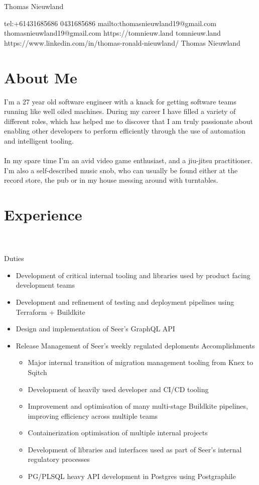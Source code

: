 \documentclass{resume}
\begin{document}
\ContactName
{Thomas Nieuwland}

\ContactInfoDigital
  {tel:+61431685686}
  {0431685686}
  {mailto:thomasnieuwland19@gmail.com}
  {thomasnieuwland19@gmail.com}
  {https://tomnieuw.land}
  {tomnieuw.land}
  {https://www.linkedin.com/in/thomas-ronald-nieuwland/}
  {Thomas Nieuwland}

\section{{\faUser} About Me}
I'm a 27 year old software engineer with a knack for getting software teams running like well oiled machines. During my 
career I have filled a variety of different roles, which has helped me to discover that I am truly passionate about 
enabling other developers to perform efficiently through the use of automation and intelligent tooling.
\\~\\
In my spare time I'm an avid video game enthusiast, and a jiu-jitsu practitioner. I'm also a self-described music
snob, who can usually be found either at the record store, the pub or in my house messing around with turntables.

\section{{\faBriefcase} Experience}
 \\
 \\
Duties \\
\begin{itemize}
  \item Development of critical internal tooling and libraries used by product facing development teams
  \item Development and refinement of testing and deployment pipelines using Terraform + Buildkite
  \item Design and implementation of Seer's GraphQL API
  \item Release Management of Seer's weekly regulated deploments
Accomplishments
\begin{itemize}
  \item Major internal transition of migration management tooling from Knex to Sqitch
  \item Development of heavily used developer and CI/CD tooling
  \item Improvement and optimisation of many multi-stage Buildkite pipelines, improving efficiency across multiple teams
  \item Containerization optimisation of multiple internal projects
  \item Development of libraries and interfaces used as part of Seer's internal regulatory processes
  \item PG/PLSQL heavy API development in Postgres using Postgraphile
\end{itemize}
\end{itemize}
\end{document}
